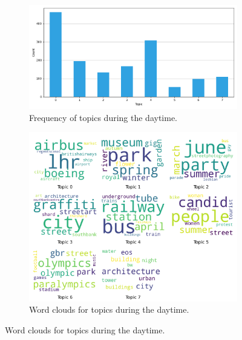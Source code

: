 \documentclass{article}
\theoremstyle{definition}
\theoremstyle{remark}
\begin{document}
\begin{figure}[!h]
    \centering
    \begin{subfigure}{0.45\textwidth}
        \centering
        \includegraphics[width=\linewidth]{figures/places_sense_daytime_locals.png} 
        \caption{Frequency of topics during the daytime.}
        \label{fig:places_sense_daytime_locals}
    \end{subfigure}
    \hfill
    \begin{subfigure}{0.5\textwidth}
        \centering
        \includegraphics[width=\linewidth]{figures/topics_daytime_locals.png} 
        \caption{Word clouds for topics during the daytime.}
        \label{fig:topics_daytime_locals}
    \end{subfigure}


\end{figure}
\end{document}
